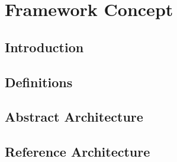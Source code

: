 \section{Framework Concept}

\subsection{Introduction}

\subsection{Definitions}

\subsection{Abstract Architecture}




\subsection{Reference Architecture}